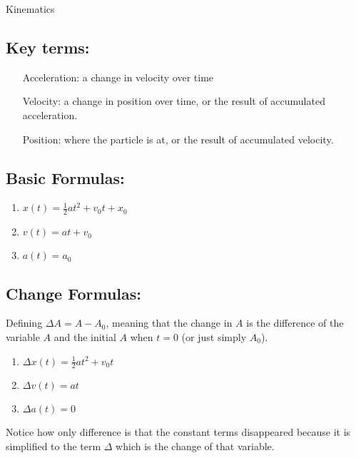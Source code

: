 \documentclass[]{scrreprt}
\title{}
\author{}
\begin{document}
\maketitle

\begin{abstract}
	
\end{abstract}
\begin{section} {Kinematics}
	\subsection{Key terms:}
		\begin{enumerate}
			\item[Acceleration:]
				a change in velocity over time
			
			\item [Velocity:] 
				a change in position over time, or the result of accumulated acceleration.
			
			\item [Position:]
			 	where the particle is at, or the result of accumulated velocity.
		\end{enumerate}
		
	\subsection{Basic Formulas:}
		\begin{enumerate}
			\item $x(t) = \frac{1}{2}at^2 + v_0t+x_0$
			\item $v(t)=at+v_0$
			\item $a(t) = a_0$
		\end{enumerate}	
	
	\subsection{Change Formulas:} 
		Defining $\Delta A = A - A_0$, meaning that the change in $A$ is the difference of the variable $A$ and the initial $A$ when $t = 0$ (or just simply $A_0$).
			\begin{enumerate}
				\item $\Delta x(t) = \frac{1}{2}at^2 + v_0t$
				\item $\Delta v(t)=at$
				\item $\Delta a(t) = 0$	
			\end{enumerate}
		Notice how only difference is that the constant terms disappeared because it is simplified to the term $\Delta$ which is the change of that variable. 
	

\end{section}
\end{document}
